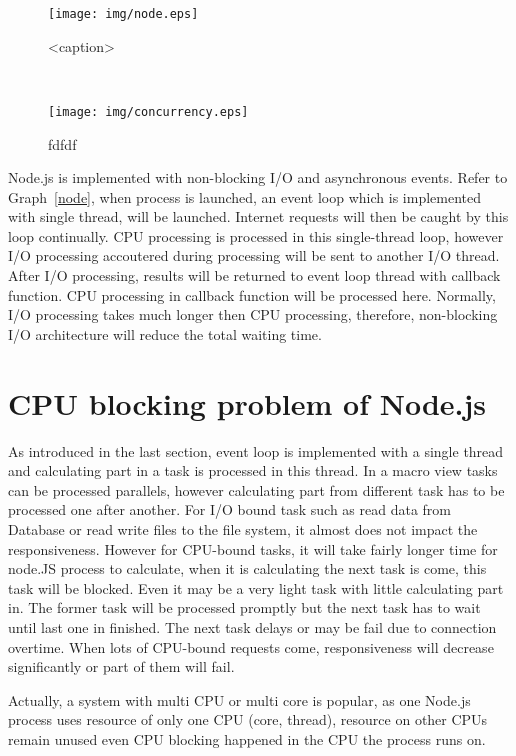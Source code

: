 \documentclass[JIP]{ipsj}
\begin{document}
\begin{figure}[tb] 
	\texttt{[image: img/node.eps]}
	\caption{<caption>} 
	\label{ . . . } 
\end{figure}\

\begin{figure}[t]
	\texttt{[image: img/concurrency.eps]}
	\caption{fdfdf} 
	\label{dfd} 
\end{figure}
Node.js is implemented with non-blocking I/O and asynchronous events. Refer to Graph~\ref{node}, when process is launched, an event loop which is implemented with single thread, will be launched.
Internet requests will then be caught by this loop continually. CPU processing is processed in this single-thread loop, however I/O processing accoutered during processing will be sent to another I/O thread.
After I/O processing, results will be returned to event loop thread with callback function. CPU processing in callback function will be processed here.
Normally, I/O processing takes much longer then CPU processing, therefore, non-blocking I/O architecture will reduce the total waiting time.


\section{CPU blocking problem of Node.js}
As introduced in the last section, event loop is implemented with a single thread and calculating part in a task is processed in this thread. In a macro view tasks can be processed parallels, however calculating part from different task has to be processed one after another. For I/O bound task such as read data from Database or read write files to the file system, it almost does not impact the responsiveness. However for CPU-bound tasks, it will take fairly longer time for node.JS process to calculate, when it is calculating the next task is come, this task will be blocked. Even it may be a very light task with little calculating part in.
The former task will be processed promptly but the next task has to wait until last one in finished. 
The next task delays or may be fail due to connection overtime. 
When lots of CPU-bound requests come, responsiveness will decrease significantly or part of them will fail.

Actually, a system with multi CPU or multi core is popular, as one Node.js process uses resource of only one CPU (core, thread), resource on other CPUs remain unused even CPU blocking happened in the CPU the process runs on.
\end{document}
